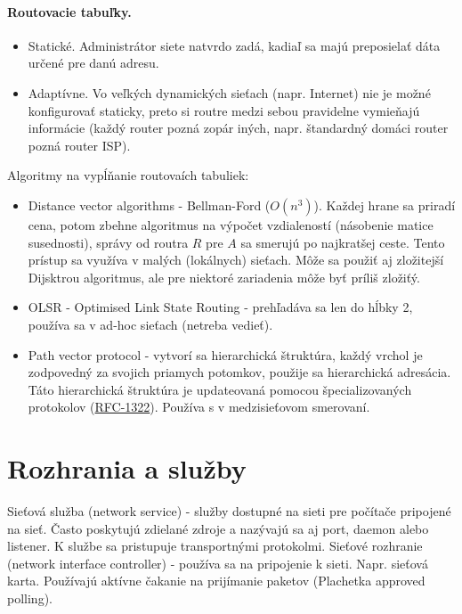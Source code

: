 \documentclass[10pt,a4paper]{article}
\begin{document}
\paragraph{Routovacie tabuľky.} 
\begin{itemize}
\item Statické. Administrátor siete natvrdo zadá, kadiaľ sa majú preposielať dáta určené pre danú adresu.           
\item Adaptívne. Vo veľkých dynamických sieťach (napr. Internet) nie je možné konfigurovať staticky, preto si routre medzi sebou pravidelne vymieňajú informácie (každý router pozná zopár iných, napr. štandardný domáci router pozná router ISP). 
\end{itemize} 

Algoritmy na vypĺňanie routovaích tabuliek:
\begin{itemize}
\item Distance vector algorithms - Bellman-Ford ($O(n^3)$). Každej hrane sa priradí cena, potom zbehne algoritmus na výpočet vzdialeností (násobenie matice susednosti), správy od routra $R$ pre $A$ sa smerujú po najkratšej ceste. Tento prístup sa využíva v malých (lokálnych) sieťach. Môže sa použiť aj zložitejší Dijsktrou algoritmus, ale pre niektoré zariadenia môže byť príliš zložiťý.           
\item OLSR - Optimised Link State Routing - prehľadáva sa len do hĺbky 2, používa sa v ad-hoc sieťach (netreba vedieť). 
\item Path vector protocol - vytvorí sa hierarchická štruktúra, každý vrchol je zodpovedný za svojich priamych potomkov, použije sa hierarchická adresácia. Táto hierarchická štruktúra je updateovaná pomocou špecializovaných protokolov (\href{http://tools.ietf.org/html/rfc1322}{RFC-1322}). Používa s v medzisieťovom smerovaní.  
\end{itemize}
              
                                                         
\section{Rozhrania a služby}                
Sieťová služba (network service) - služby dostupné na sieti pre počítače pripojené na sieť. Často poskytujú zdielané zdroje a nazývajú sa aj port, daemon alebo listener.  K službe sa pristupuje transportnými protokolmi. 
Sieťové rozhranie (network interface controller) - používa sa na pripojenie k sieti. Napr. sieťová karta. Používajú aktívne čakanie na prijímanie paketov (Plachetka approved polling). 
     
\end{document}

